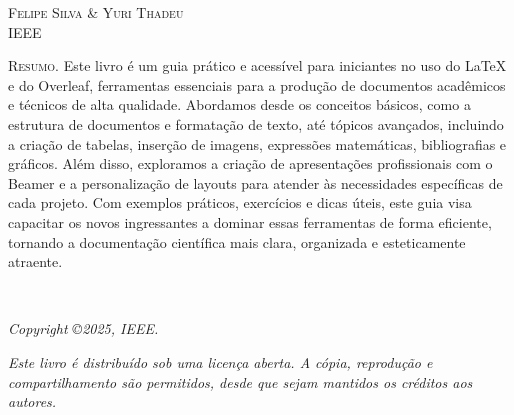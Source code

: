 \documentclass[10pt, openany, a5paper]{book}
\begin{document}
{\large\textsc{Felipe Silva \& Yuri Thadeu}}\\
{IEEE}\\[20mm]  
\flushleft
\begin{minipage}{\textwidth}
\textsc{Resumo.} Este livro é um guia prático e acessível para iniciantes no uso do LaTeX e do Overleaf, ferramentas essenciais para a produção de documentos acadêmicos e técnicos de alta qualidade. Abordamos desde os conceitos básicos, como a estrutura de documentos e formatação de texto, até tópicos avançados, incluindo a criação de tabelas, inserção de imagens, expressões matemáticas, bibliografias e gráficos. Além disso, exploramos a criação de apresentações profissionais com o Beamer e a personalização de layouts para atender às necessidades específicas de cada projeto. Com exemplos práticos, exercícios e dicas úteis, este guia visa capacitar os novos ingressantes a dominar essas ferramentas de forma eficiente, tornando a documentação científica mais clara, organizada e esteticamente atraente.
\end{minipage}\\[1cm]   
\vfill
    \begin{center}
    	\textit{Copyright \copyright 2025, IEEE.}
    \end{center}
    \begin{center}
    	\textit{Este livro é distribuído sob uma licença aberta. A cópia, reprodução e compartilhamento são permitidos, desde que sejam mantidos os créditos aos autores.}
    \end{center}
\clearpage %

\clearpage
\setcounter{page}{1} %

\thispagestyle{empty}
\tableofcontents










\end{document}
